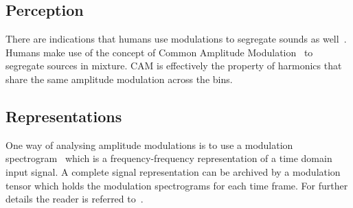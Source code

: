 \subsection{Perception}
There are indications that humans use modulations to segregate sounds as well~\cite{dau99}.
Humans make use of the concept of Common Amplitude Modulation~\cite{bregman90} to segregate sources in mixture.
CAM is effectively the property of harmonics that share the
same amplitude modulation across the bins.

\subsection{Representations}
One way of analysing amplitude modulations is to use a modulation spectrogram~\cite{greenberg97} which is a frequency-frequency
representation of a time domain input signal.
A complete signal representation can be archived by a modulation tensor which holds the modulation spectrograms for each time frame.
For further details the reader is referred to~\cite{barker15}.

